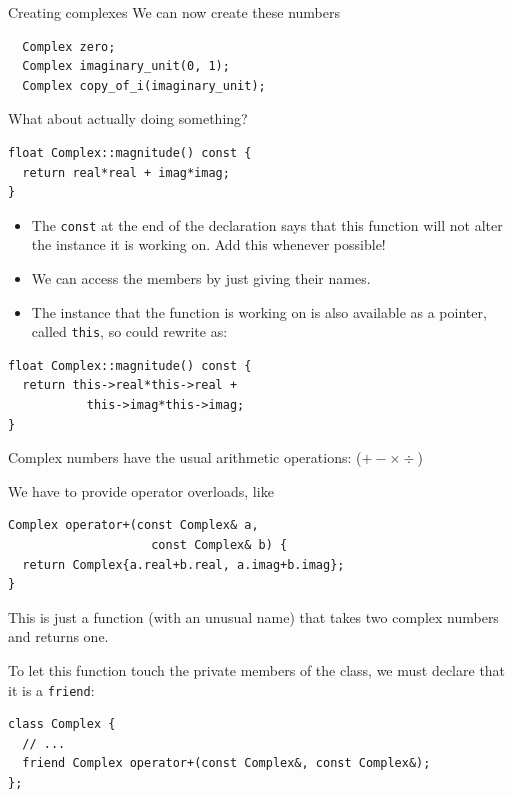 \documentclass[presentation,t]{beamer}
\newcommand{\code}[1]{\lstinline!#1!}
\begin{document}
\begin{frame}[fragile]{Creating complexes}
We can now create these numbers
\begin{lstlisting}
  Complex zero;
  Complex imaginary_unit(0, 1);
  Complex copy_of_i(imaginary_unit);
\end{lstlisting}
What about actually doing something?
\end{frame}

\begin{frame}[fragile]{}
\begin{lstlisting}
float Complex::magnitude() const {
  return real*real + imag*imag;
}
\end{lstlisting}
  \begin{itemize}
  \item The \code{const} at the end of the declaration says that this
    function will not alter the instance it is working on. Add this
    whenever possible!

  \item We can access the members by just giving their names.

  \item The instance that the function is working on is also available
    as a pointer, called \code{this}, so could rewrite as:
  \end{itemize}
\begin{lstlisting}
float Complex::magnitude() const {
  return this->real*this->real +
           this->imag*this->imag;
}
\end{lstlisting}
\end{frame}

\begin{frame}[fragile]{}
  Complex numbers have the usual arithmetic operations: ($+-\times\div$)%
  
  We have to provide operator overloads, like
\begin{lstlisting}
Complex operator+(const Complex& a,
                    const Complex& b) {
  return Complex{a.real+b.real, a.imag+b.imag};
}
\end{lstlisting}
  This is just a function (with an unusual name) that takes two
  complex numbers and returns one.

  To let this function touch the private members of the class, we must
  declare that it is a \code{friend}:
\begin{lstlisting}
class Complex {
  // ...
  friend Complex operator+(const Complex&, const Complex&);
};
\end{lstlisting}
\end{frame}
\end{document}
